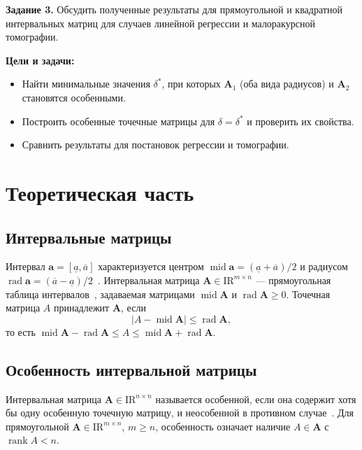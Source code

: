 \documentclass[a4paper, 14pt]{extarticle}
\begin{document}
\textbf{Задание 3.} Обсудить полученные результаты для прямоугольной и квадратной интервальных матриц
для случаев линейной регрессии и малоракурсной томографии.

\textbf{Цели и задачи:}
\begin{itemize}
    \item Найти минимальные значения $\delta^*$, при которых $\mathbf{A}_1$ (оба вида радиусов) и $\mathbf{A}_2$ становятся особенными.
    \item Построить особенные точечные матрицы для $\delta = \delta^*$ и проверить их свойства.
    \item Сравнить результаты для постановок регрессии и томографии.
\end{itemize}

\section{Теоретическая часть}

\subsection{Интервальные матрицы}

Интервал $\mathbf{a} = [\underline{a}, \overline{a}]$ характеризуется центром $\operatorname{mid}\mathbf{a} = (\underline{a} + \overline{a})/2$ и радиусом $\operatorname{rad}\mathbf{a} = (\overline{a} - \underline{a})/2$~\cite[с.~17, 25]{bazhenov}. Интервальная матрица $\mathbf{A} \in \mathrm{IR}^{m\times n}$ --- прямоугольная таблица интервалов~\cite[с.~31--32]{bazhenov}, задаваемая матрицами $\operatorname{mid}\mathbf{A}$ и $\operatorname{rad}\mathbf{A} \ge 0$. Точечная матрица $A$ принадлежит $\mathbf{A}$, если
\begin{equation}
    |A - \operatorname{mid}\mathbf{A}| \le \operatorname{rad}\mathbf{A},
    \label{eq:member}
\end{equation}
то есть $\operatorname{mid}\mathbf{A} - \operatorname{rad}\mathbf{A} \le A \le \operatorname{mid}\mathbf{A} + \operatorname{rad}\mathbf{A}$.

\subsection{Особенность интервальной матрицы}

Интервальная матрица $\mathbf{A} \in \mathrm{IR}^{n\times n}$ называется особенной, если она содержит хотя бы одну особенную точечную матрицу, и неособенной в противном случае~\cite[с.~50]{bazhenov}. Для прямоугольной $\mathbf{A} \in \mathrm{IR}^{m\times n}$, $m \ge n$, особенность означает наличие $A \in \mathbf{A}$ с $\operatorname{rank} A < n$.
\end{document}
